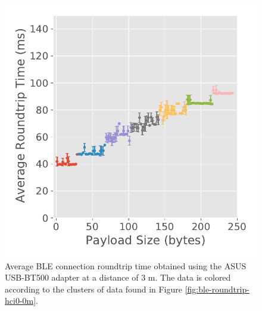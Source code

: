 \begin{figure}[H]
\begin{minipage}{0.45\linewidth}
        \centering
        \includegraphics[width=\linewidth]{images/ble-roundtrip-hci0-300cm.pdf}
        \caption[Average \acs{BLE} connection roundtrip time obtained using the ASUS USB-BT500 adapter at a distance of 3 m.]{Average \acs{BLE} connection roundtrip time obtained using the ASUS USB-BT500 adapter at a distance of $3\text{ m}$. The data is colored according to the clusters of data found in Figure \ref{fig:ble-roundtrip-hci0-0m}.}
        \label{fig:ble-roundtrip-hci0-3m}
    \end{minipage}
\end{figure}

